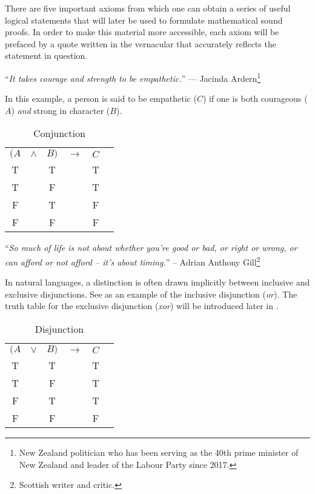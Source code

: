 There are five important axioms from which one can obtain a series of useful logical
statements that will later be used to formulate mathematical sound proofs. In order
to make this material more accessible, each axiom will be prefaced by a quote written
in the vernacular that accurately reflects the statement in question.

\begin{displayquote}
    ``\emph{It takes courage and strength to be empathetic.}''
    --- Jacinda Ardern\footnote{New Zealand politician who has been serving as the
    40th prime minister of New Zealand and leader of the Labour Party since 2017.}
\end{displayquote}

In this example, a person is said to be empathetic (\(C\)) if one is both
courageous (\(A\)) \emph{and} strong in character (\(B\)).

\begin{table}[hbt!]
    \centering
    \begin{tabular}{*{6}{c}}
        $(A$ & $\land$ & $B)$ & $\rightarrow$ & $C$ \\
           T &         & T    &               & T   \\
           T &         & F    &               & T   \\
           F &         & T    &               & F   \\
           F &         & F    &               & F   \\
    \end{tabular}
    \caption{Conjunction}\label{table-conjunction}
\end{table}

\begin{displayquote}
    ``\emph{So much of life is not about whether you're good or bad, or right or
    wrong, or can afford or not afford -- it's about timing.}''
    -- Adrian Anthony Gill\footnote{Scottish writer and critic.}
\end{displayquote}

In natural languages, a distinction is often drawn implicitly between inclusive
and exclusive disjunctions. See  as an example of
the inclusive disjunction (\emph{or}). The truth table for the exclusive disjunction
(\emph{xor}) will be introduced later in .

\begin{table}[hbt!]
    \centering
    \begin{tabular}{*{6}{c}}
        $(A$ & $\lor$ & $B)$ & $\rightarrow$ & $C$ \\
           T &        & T    &               & T   \\
           T &        & F    &               & T   \\
           F &        & T    &               & T   \\
           F &        & F    &               & F   \\
    \end{tabular}
    \caption{Disjunction}\label{table-disjunction}
\end{table}

